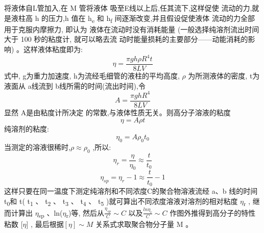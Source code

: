 \documentclass[11pt]{report}
\begin{document}
将液体自L管加入,在 M 管将液体
吸至E线以上后,任其流下,这样促使
流动的力,就是液柱高 h 的压力,h 值在
h\textsubscript{e} 和 h\textsubscript{f} 间逐渐改变,并且假设促使液体
流动的力全部用于克服内摩擦力, 即认为
液体在流动时没有消耗能量 (一般选择纯溶剂流出时间大于 100 秒的粘度计, 就可以略去流
动时能量损耗的主要部分——动能消耗的影响)
 。这样液体粘度即为:
\[
\eta=\frac{\pi gh\rho R^{4}t}{8LV}
\]
式中, g为重力加速度, h为流经毛细管的液柱的平均高度, \(\rho\) 为所测液体的密度, t为
液面从 a线流到 b线所需的时间(流出时间),令
\[
A=\frac{\pi ghR^{4}}{8LV}
\]
显然 A是由粘度计所决定
的常数,与液体性质无关。则高分子溶液的粘度
\[
\eta =A\rho t
\]
纯溶剂的粘度:
\[
\eta_{0}=A\rho_{0}t_{0}
\]
当测定的溶液很稀时,\(\rho \approx \rho_{0}\) ,所以:
\[
\eta_{r}=\frac{\eta}{\eta_{0}}\approx \frac{t}{t_{0}}
\]
\[
\eta_{sp}=\eta_{r}-1\approx \frac{t}{t_{0}}-1
\]
这样只要在同一温度下测定纯溶剂和不同浓度C的聚合物溶液流经 a、b 线的时间 t\textsubscript{0}和
t( t\textsubscript{1} 、 t\textsubscript{2} 、 t\textsubscript{3} 、 t\textsubscript{4} 、 t\textsubscript{5} )就可算出不同浓度溶液对溶剂的相对粘度 \(\eta\)\textsubscript{r} ,
继而计算出 \(\eta\)\textsubscript{sp} 、ln(\(\eta\)\textsubscript{r})等,
然后从\(\frac{\eta_{sp}}{C}\sim C\) 以及\(\frac{ln\eta_{r}}{C}\sim C\) 作图外推得到高分子的特性粘数 [\(\eta\)] ,
最后根据\([\eta]\sim M\) 关系式求取聚合物分子量 M 。
\end{document}
